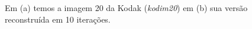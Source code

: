 


\begin{figure}
	\newline
	
	\caption[Imagem representativa com alto fator de compressão]{Em (a) temos a imagem 20 da Kodak (\textit{kodim20}) em (b) sua versão reconstruída em 10 iterações.}
	\label{fig:kodim20}
\end{figure}
